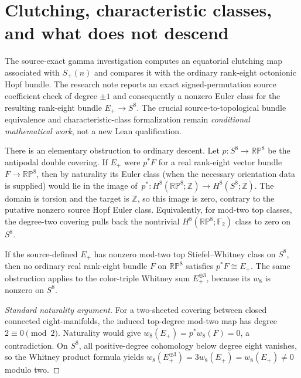 \section{Clutching, characteristic classes, and what does not descend}
The source-exact gamma investigation computes an equatorial clutching
map associated with $S_+(n)$ and compares it with the ordinary
rank-eight octonionic Hopf bundle. The research note reports
an exact signed-permutation source coefficient check of degree
$\pm1$ and consequently a nonzero Euler class for the resulting
rank-eight bundle $E_+\to S^8$. The crucial source-to-topological
bundle equivalence and characteristic-class formalization remain
\emph{conditional mathematical work}, not a new Lean qualification.

There is an elementary obstruction to ordinary descent. Let
$p:S^8\to\mathbb{RP}^8$ be the antipodal double covering.
If $E_+$ were $p^*F$ for a real rank-eight vector bundle
$F\to\mathbb{RP}^8$, then by naturality its Euler class (when the
necessary orientation data is supplied) would lie in the image of
$\,p^*:H^8(\mathbb{RP}^8;\mathbb Z)\to
H^8(S^8;\mathbb Z)$. The domain is torsion and the target is
$\mathbb Z$, so this image is zero, contrary to the putative
nonzero source Hopf Euler class. Equivalently, for mod-two top
classes, the degree-two covering pulls back the nontrivial
$H^8(\mathbb{RP}^8;\mathbb F_2)$ class to zero on $S^8$.

\begin{proposition}
\label{prop:hopf-no-descent}
If the source-defined $E_+$ has nonzero mod-two top Stiefel--Whitney
class on $S^8$, then no ordinary real rank-eight bundle $F$ on
$\mathbb{RP}^8$ satisfies $p^*F\cong E_+$. The same obstruction
applies to the color-triple Whitney sum $E_+^{\oplus3}$, because its
$w_8$ is nonzero on $S^8$.
\end{proposition}
\begin{proof}[Standard naturality argument]
For a two-sheeted covering between closed connected eight-manifolds,
the induced top-degree mod-two map has degree $2\equiv0\pmod2$.
Naturality would give $w_8(E_+)=p^*w_8(F)=0$, a contradiction.
On $S^8$, all positive-degree cohomology below degree eight
vanishes, so the Whitney product formula yields
$w_8(E_+^{\oplus3})=3w_8(E_+)=w_8(E_+)\ne0$ modulo two.
\end{proof}

